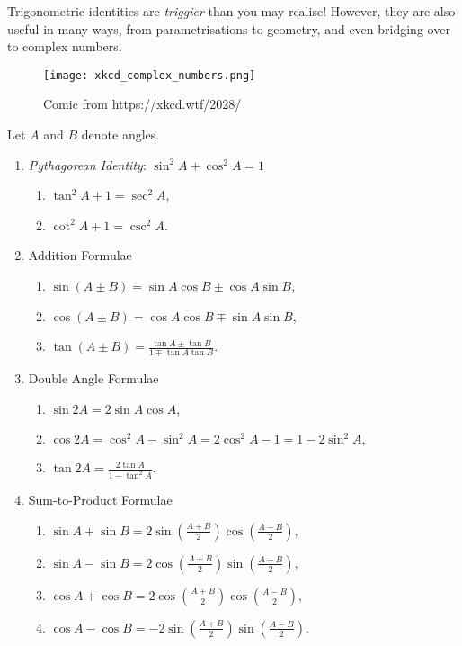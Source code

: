 \documentclass[../jarvis.tex]{subfiles}
\begin{document}
Trigonometric identities are \textit{triggier} than you may realise! However, they are also useful in many ways, from parametrisations to geometry, and even bridging over to complex numbers.
\begin{figure}[H]
    \centering
    \texttt{[image: xkcd\_complex\_numbers.png]}
    \caption{Comic from https://xkcd.wtf/2028/}
\end{figure}

\begin{proposition}
    Let $A$ and $B$ denote angles.
    \begin{enumerate}
        \item \textit{Pythagorean Identity}: $\sin^2A+\cos^2A=1$
        \begin{enumerate}
            \item $\tan^2A+1=\sec^2A$,
            \item $\cot^2A+1=\csc^2A$.
        \end{enumerate}
        \item Addition Formulae
        \begin{enumerate}
            \item $\sin(A\pm B)=\sin A\cos B\pm \cos A\sin B$,
            \item $\cos(A\pm B)=\cos A\cos B\mp \sin A\sin B$,
            \item $\tan(A\pm B)=\frac{\tan A\pm\tan B}{1\mp \tan A\tan B}.$
        \end{enumerate}
        \item Double Angle Formulae
        \begin{enumerate}
            \item $\sin 2A=2\sin A\cos A$,
            \item $\cos 2A=\cos^2A-\sin^2A=2\cos^2A-1=1-2\sin^2A,$
            \item $\tan 2A=\frac{2\tan A}{1-\tan^2 A}.$
        \end{enumerate}  
        \item Sum-to-Product Formulae
        \begin{enumerate}
            \item $\sin A+\sin B=2\sin\left(\frac{A+B}{2}\right)\cos\left(\frac{A-B}{2}\right),$
            \item $\sin A-\sin B=2\cos\left(\frac{A+B}{2}\right)\sin\left(\frac{A-B}{2}\right),$
            \item $\cos A+\cos B=2\cos\left(\frac{A+B}{2}\right)\cos\left(\frac{A-B}{2}\right),$
            \item $\cos A-\cos B=-2\sin\left(\frac{A+B}{2}\right)\sin\left(\frac{A-B}{2}\right).$
        \end{enumerate}
    \end{enumerate}
\end{proposition}
\end{document}
